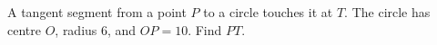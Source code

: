 A tangent segment from a point $P$ to a circle touches it at $T$. The circle has centre $O$, radius $6$, and $OP=10$. Find $PT$.

